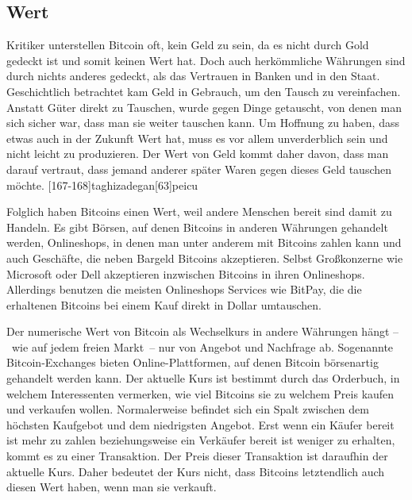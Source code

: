 \subsection{Wert}

Kritiker unterstellen Bitcoin oft, kein Geld zu sein, da es nicht durch Gold gedeckt ist und somit keinen Wert hat.
Doch auch herkömmliche Währungen sind durch nichts anderes gedeckt, als das Vertrauen in Banken und in den Staat.
Geschichtlich betrachtet kam Geld in Gebrauch, um den Tausch zu vereinfachen.
Anstatt Güter direkt zu Tauschen, wurde gegen Dinge getauscht, von denen man sich sicher war, dass man sie weiter tauschen kann.
Um Hoffnung zu haben, dass etwas auch in der Zukunft Wert hat, muss es vor allem unverderblich sein und nicht leicht zu produzieren.
Der Wert von Geld kommt daher davon, dass man darauf vertraut, dass jemand anderer später Waren gegen dieses Geld tauschen möchte.
[167-168]{taghizadegan}[63]{peicu}

Folglich haben Bitcoins einen Wert, weil andere Menschen bereit sind damit zu Handeln.
Es gibt Börsen, auf denen Bitcoins in anderen Währungen gehandelt werden, Onlineshops, in denen man unter anderem mit Bitcoins zahlen kann und auch Geschäfte, die neben Bargeld Bitcoins akzeptieren.
Selbst Großkonzerne wie Microsoft oder Dell akzeptieren inzwischen Bitcoins in ihren Onlineshops.
Allerdings benutzen die meisten Onlineshops Services wie BitPay, die die erhaltenen Bitcoins bei einem Kauf direkt in Dollar umtauschen.

Der numerische Wert von Bitcoin als Wechselkurs in andere Währungen hängt --~wie auf jedem freien Markt~-- nur von Angebot und Nachfrage ab.
Sogenannte Bitcoin-Exchanges bieten Online-Plattformen, auf denen Bitcoin börsenartig gehandelt werden kann.
Der aktuelle Kurs ist bestimmt durch das Orderbuch, in welchem Interessenten vermerken, wie viel Bitcoins sie zu welchem Preis kaufen und verkaufen wollen.
Normalerweise befindet sich ein Spalt zwischen dem höchsten Kaufgebot und dem niedrigsten Angebot.
Erst wenn ein Käufer bereit ist mehr zu zahlen beziehungsweise ein Verkäufer bereit ist weniger zu erhalten, kommt es zu einer Transaktion.
Der Preis dieser Transaktion ist daraufhin der aktuelle Kurs.
Daher bedeutet der Kurs nicht, dass Bitcoins letztendlich auch diesen Wert haben, wenn man sie verkauft.
